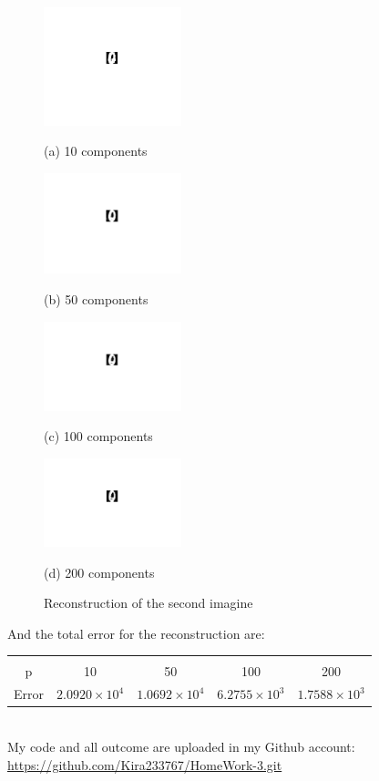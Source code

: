 \documentclass[letterpaper,12pt]{article}
\begin{document}
\begin{center}
\begin{figure}[h]

\begin{minipage}{0.48\linewidth}
  \centerline{\includegraphics[width=4.0cm]{pca2_10.jpg}}
  \centerline{(a) 10 components}
\end{minipage}
\hfill
\begin{minipage}{.48\linewidth}
  \centerline{\includegraphics[width=4.0cm]{pca2_50.jpg}}
  \centerline{(b) 50 components}
\end{minipage}
\vfill
\begin{minipage}{0.48\linewidth}
  \centerline{\includegraphics[width=4.0cm]{pca2_100.jpg}}
  \centerline{(c) 100 components}
\end{minipage}
\hfill
\begin{minipage}{0.48\linewidth}
  \centerline{\includegraphics[width=4.0cm]{pca2_200.jpg}}
  \centerline{(d) 200 components}
\end{minipage}
\caption{Reconstruction of the second imagine}
\label{fig:res}

\end{figure}
\end{center}
And the total error for the reconstruction are:
\begin{center}

\begin{tabular}{c c c c c}
\hline \\
p & 10 & 50 & 100 & 200 \\
Error & $2.0920 \times 10 ^ 4$ & $1.0692\times 10 ^ 4$ & $6.2755\times 10 ^ 3$ & $1.7588\times 10 ^ 3$ \\
\hline
\end{tabular}
\end{center}
\quad \\

My code and all outcome are uploaded in my Github account:
\url{https://github.com/Kira233767/HomeWork-3.git}
\end{document}
